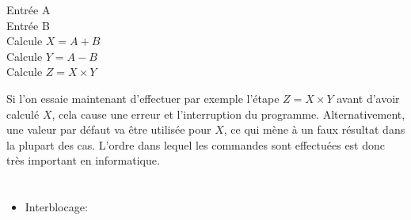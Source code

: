 {{\begin{adjustwidth}{1.5em}{0em}
Entrée A  \\
Entrée B  \\
Calcule ${X = A + B}$  \\
Calcule ${Y = A - B}$  \\
Calcule ${Z = X \times Y}$
\end{adjustwidth}

Si l’on essaie maintenant d’effectuer par exemple l’étape ${Z = X \times Y}$ avant d’avoir calculé ${X}$, cela cause une erreur et l’interruption du programme. Alternativement, une valeur par défaut va être utilisée pour ${X}$, ce qui mène à un faux résultat dans la plupart des cas. L’ordre dans lequel les commandes sont effectuées est donc très important en informatique.



\section*{\BrochureWebsitesAndKeywords}
{\raggedright
\begin{itemize}
  \item Interblocage: \href{https://fr.wikipedia.org/wiki/Interblocage}{}
\end{itemize}


}

}{}

\def\AuthorLoyoA{} %
\def\AuthorBarotM{} %
\def\AuthorFreiF{} %
\def\AuthorGallenbacherJ{} %
\def\AuthorDatzkoS{} %
\def\AuthorPelletE{} %

\newpage}{}
